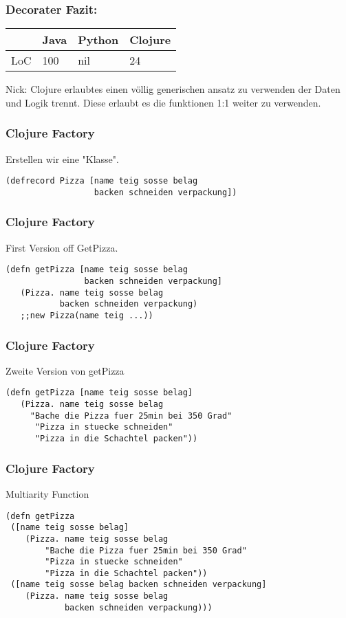 \documentclass[compress, blue]{beamer}
\begin{document}



\begin{frame}\frametitle{Decorater Fazit:}
    \begin{tabular}{l | l l l}
     & Java &  Python & Clojure  \\
     \hline
    LoC & 100 &  nil & 24  \\
  \end{tabular}
  \begin{block}{Nick: }
    Clojure erlaubtes einen völlig generischen ansatz zu verwenden der
    Daten und Logik trennt. Diese erlaubt es die funktionen 1:1 weiter
    zu verwenden.
  \end{block}
\end{frame}

\begin{frame}[fragile]\frametitle{Clojure Factory}
  Erstellen wir eine "Klasse".\pause
  \begin{lstlisting}
(defrecord Pizza [name teig sosse belag 
                  backen schneiden verpackung])
  \end{lstlisting}
\end{frame}

\begin{frame}[fragile]\frametitle{Clojure Factory}

First Version off GetPizza.
\pause
  \begin{lstlisting}
(defn getPizza [name teig sosse belag 
                backen schneiden verpackung] 
   (Pizza. name teig sosse belag
           backen schneiden verpackung)
   ;;new Pizza(name teig ...))
  \end{lstlisting}
\end{frame}

\begin{frame}[fragile]\frametitle{Clojure Factory}

Zweite Version von getPizza
\pause
  \begin{lstlisting}
(defn getPizza [name teig sosse belag]
   (Pizza. name teig sosse belag
     "Bache die Pizza fuer 25min bei 350 Grad"
      "Pizza in stuecke schneiden"
      "Pizza in die Schachtel packen"))
  \end{lstlisting}
\end{frame}

\begin{frame}[fragile]\frametitle{Clojure Factory}

Multiarity Function
\pause 
\begin{lstlisting}
(defn getPizza
 ([name teig sosse belag]
    (Pizza. name teig sosse belag
        "Bache die Pizza fuer 25min bei 350 Grad"
        "Pizza in stuecke schneiden"
        "Pizza in die Schachtel packen"))
 ([name teig sosse belag backen schneiden verpackung] 
    (Pizza. name teig sosse belag 
            backen schneiden verpackung)))
  \end{lstlisting}
\end{frame}
\end{document}
